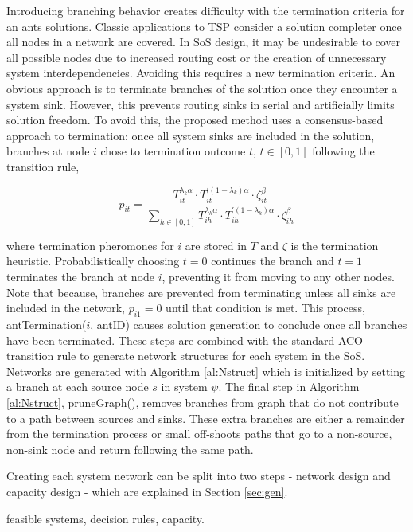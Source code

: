 \documentclass[preprint,12pt]{elsarticle}
\begin{document}
Introducing branching behavior creates difficulty with the termination criteria for an ants solutions. Classic applications to TSP consider a solution completer once all nodes in a network are covered. In SoS design, it may be undesirable to cover all possible nodes due to increased routing cost or the creation of unnecessary system interdependencies. Avoiding this requires a new termination criteria. An obvious approach is to terminate branches of the solution once they encounter a system sink. However, this prevents routing sinks in serial and artificially limits solution freedom. To avoid this, the proposed method uses a consensus-based approach to termination: once all system sinks are included in the solution, branches at node $i$ chose to termination outcome $t$, $t\in[0,1]$ following the transition rule,

\begin{equation}
p_{it}=\frac{T_{it}^{\lambda_k\alpha}\cdot T_{it}^{'(1-\lambda_k)\alpha}\cdot\zeta_{it}^{\beta}}{\sum_{h\in[0,1]}T_{ih}^{\lambda_k\alpha}\cdot T_{ih}^{'(1-\lambda_k)\alpha}\cdot\zeta_{ih}^\beta}
\label{eq:Term}
\end{equation}

\noindent where termination pheromones for $i$ are stored in $T$ and $\zeta$ is the termination heuristic. Probabilistically choosing $t=0$ continues the branch and $t=1$ terminates the branch at node $i$, preventing it from moving to any other nodes. Note that because, branches are prevented from terminating unless all sinks are included in the network, $p_{i1}=0$ until that condition is met. This process, antTermination($i$, antID) causes solution generation to conclude once all branches have been terminated. These steps are combined with the standard ACO transition rule to generate network structures for each system in the SoS. Networks are generated with Algorithm \ref{al:Nstruct} which is initialized by setting a branch at each source node $s$ in system $\psi$. The final step in Algorithm \ref{al:Nstruct}, pruneGraph(), removes branches from graph that do not contribute to a path between sources and sinks. These extra branches are either a remainder from the termination process or small off-shoots paths that go to a non-source, non-sink node and return following the same path. 

Creating each system network can be split into two steps -  network design and capacity design - which are explained in Section \ref{sec:gen}. 

feasible systems, decision rules, capacity.
\end{document}
